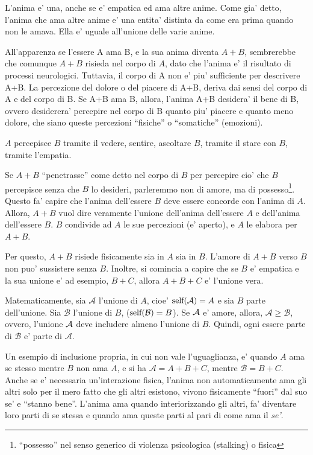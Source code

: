 L'anima e' una, anche se e' empatica ed ama altre anime. Come gia' detto, l'anima che ama altre anime e' una entita' distinta da come era prima quando non le amava. Ella e' uguale all'unione delle varie anime. 

All'apparenza se l'essere A ama B, e la sua anima diventa $A+B$, sembrerebbe che comunque $A+B$ risieda nel corpo di $A$, dato che l'anima e' il risultato di processi neurologici. Tuttavia, il corpo di A non e' piu' sufficiente per descrivere A+B. La percezione del dolore o del piacere di A+B, deriva dai sensi del corpo di A e del corpo di B. Se A+B ama B, allora, l'anima A+B desidera' il bene di B, ovvero desiderera' percepire nel corpo di B quanto piu' piacere e quanto meno dolore, che siano queste percezioni ``fisiche'' o ``somatiche'' (emozioni). 

$A$ percepisce $B$ tramite il vedere, sentire, ascoltare $B$, tramite il stare con $B$, tramite l'empatia.

Se $A+B$ ``penetrasse'' come detto nel corpo di $B$ per percepire cio' che $B$ percepisce senza che $B$ lo desideri, parleremmo non di amore, ma di possesso\footnote{``possesso'' nel senso generico di violenza psicologica (stalking) o fisica}. Questo fa' capire che l'anima dell'essere $B$ deve essere concorde con l'anima di $A$. Allora, $A+B$ vuol dire veramente l'unione dell'anima dell'essere $A$ e dell'anima dell'essere $B$. $B$ condivide ad $A$ le sue percezioni (e' aperto), e $A$ le elabora per $A+B$. 

Per questo, $A+B$ risiede fisicamente sia in $A$ sia in $B$. L'amore di $A+B$ verso $B$ non puo' sussistere senza $B$. Inoltre, si comincia a capire che se $B$ e' empatica e la sua unione e' ad esempio, $B+C$, allora $A+B+C$ e' l'unione vera.

Matematicamente, sia $\mathcal{A}$ l'unione di $A$, cioe' $\textrm{self}(\mathcal{A})=A$ e sia $B$ parte dell'unione. Sia $\mathcal{B}$ l'unione di $B$, ($\textrm{self}(\mathcal{B})=B$). Se $\mathcal{A}$ e' amore, allora, $\mathcal{A} \geq \mathcal{B}$, ovvero, l'unione $\mathcal{A}$ deve includere almeno l'unione di $B$. Quindi, ogni essere parte di $\mathcal{B}$ e' parte di $\mathcal{A}$.

Un esempio di inclusione propria, in cui non vale l'uguaglianza, e' quando $A$ ama se stesso mentre $B$ non ama $A$, e si ha $\mathcal{A}=A+B+C$, mentre $\mathcal{B}=B+C$.\\

Anche se e' necessaria un'interazione fisica, l'anima non automaticamente ama gli altri solo per il mero fatto che gli altri esistono, vivono fisicamente ``fuori'' dal suo se' e ``stanno bene''. L'anima ama quando interiorizzando gli altri, fa' diventare loro parti di se stessa e quando ama queste parti al pari di come ama il \emph{se'}.

